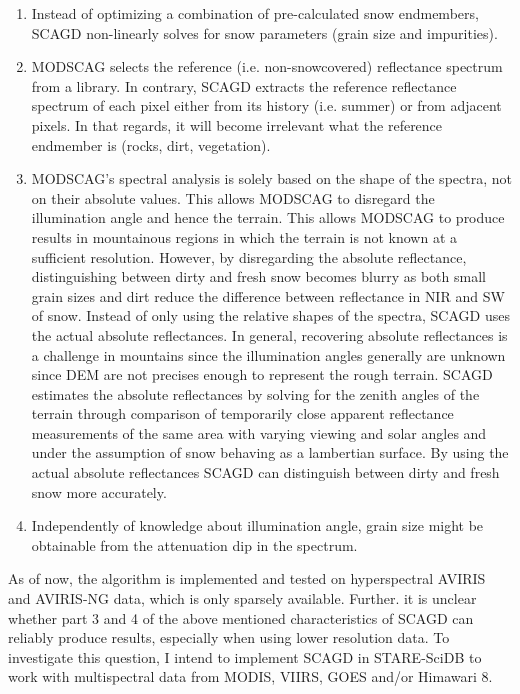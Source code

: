 \documentclass[letterpaper, parskip=half]{scrartcl}
\begin{document}
\begin{enumerate}
 \item Instead of optimizing a combination of pre-calculated snow endmembers, \gls{SCAGD} non-linearly solves for snow parameters (grain size and impurities). 
 
 \item \gls{MODSCAG} selects the reference (i.e. non-snowcovered) reflectance spectrum from a library. In contrary, \gls{SCAGD} extracts the reference reflectance spectrum of each pixel either from its history (i.e. summer) or from adjacent pixels. In that regards, it will become irrelevant what the reference endmember is (rocks, dirt, vegetation).  
 
 \item \gls{MODSCAG}'s spectral analysis is solely based on the shape of the spectra, not on their absolute values. This allows \gls{MODSCAG} to disregard the illumination angle and hence the terrain. This allows \gls{MODSCAG} to produce results in mountainous regions in which the terrain is not known at a sufficient resolution. 
 However, by disregarding the absolute reflectance, distinguishing between dirty and fresh snow becomes blurry as both small grain sizes and dirt reduce the difference between reflectance in \gls{NIR} and \gls{SW} of snow.  
 Instead of only using the relative shapes of the spectra, \gls{SCAGD} uses the actual absolute reflectances. In general, recovering absolute reflectances is a challenge in mountains since the illumination angles generally are unknown since \gls{DEM} are not precises enough to represent the rough terrain. 
 \gls{SCAGD} estimates the absolute reflectances by solving for the zenith angles of the terrain through comparison of temporarily close apparent reflectance measurements of the same area with varying viewing and solar angles and under the assumption of snow behaving as a lambertian surface.
 By using the actual absolute reflectances \gls{SCAGD} can distinguish between dirty and fresh snow more accurately.
 
 \item Independently of knowledge about illumination angle, grain size might be obtainable from the attenuation dip in the spectrum. 
 
\end{enumerate}

 
As of now, the algorithm is implemented and tested on hyperspectral \gls{AVIRIS} and \gls{AVIRIS-NG} data, which is only sparsely available. Further. it is unclear whether part 3 and 4 of the above mentioned characteristics of \gls{SCAGD} can reliably produce results, especially when using lower resolution data. To investigate this question, I intend to implement \gls{SCAGD} in STARE-SciDB to work with multispectral data from \gls{MODIS}, \gls{VIIRS}, \gls{GOES} and/or Himawari 8.
\end{document}
